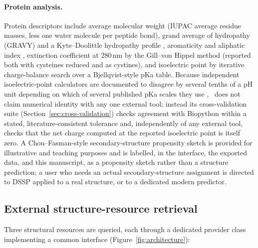 \paragraph{Protein analysis.}
Protein descriptors include average molecular weight (IUPAC average residue
masses, less one water molecule per peptide bond), grand average of
hydropathy (GRAVY) and a Kyte--Doolittle hydropathy profile
\citep{kytedoolittle1982}, aromaticity and aliphatic index
\citep{ikai1980aliphatic}, extinction coefficient at 280\,nm by the
Gill--von Hippel method \citep{gillvonhippel1989} (reported both with
cysteines reduced and as cystines), and isoelectric point by iterative
charge-balance search over a Bjellqvist-style pKa table. Because independent
isoelectric-point calculators are documented to disagree by several tenths
of a pH unit depending on which of several published pKa scales they use
\citep{kozlowski2016ipc}, \bsi\ does not claim numerical identity with any
one external tool; instead its cross-validation suite
(Section~\ref{sec:cross-validation}) checks agreement with Biopython within
a stated, literature-consistent tolerance and, independently of any external
tool, checks that the net charge computed at the reported isoelectric point
is itself zero. A Chou--Fasman-style secondary-structure propensity sketch
\citep{choufasman1978} is provided for illustrative and teaching purposes
and is labelled, in the interface, the exported data, and this manuscript,
as a propensity sketch rather than a structure prediction; a user who needs
an actual secondary-structure assignment is directed to DSSP applied to a
real structure, or to a dedicated modern predictor.

\subsection{External structure-resource retrieval}
\label{sec:retrieval}

Three structural resources are queried, each through a dedicated provider
class implementing a common interface (Figure~\ref{fig:architecture}):

